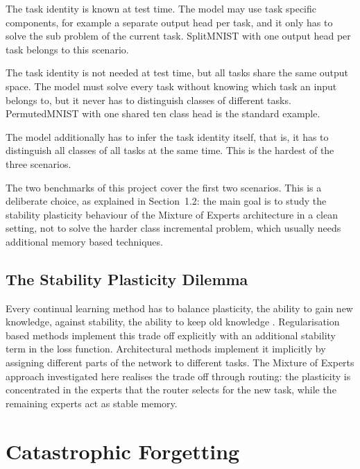 \begin{description}[style=nextline]
  \item[Task incremental learning.] The task identity is known at test
        time. The model may use task specific components, for example a
        separate output head per task, and it only has to solve the sub
        problem of the current task. SplitMNIST with one output head per
        task belongs to this scenario.
  \item[Domain incremental learning.] The task identity is not needed at
        test time, but all tasks share the same output space. The model
        must solve every task without knowing which task an input belongs
        to, but it never has to distinguish classes of different tasks.
        PermutedMNIST with one shared ten class head is the standard
        example.
  \item[Class incremental learning.] The model additionally has to infer
        the task identity itself, that is, it has to distinguish all
        classes of all tasks at the same time. This is the hardest of the
        three scenarios.
\end{description}

The two benchmarks of this project cover the first two scenarios. This is a
deliberate choice, as explained in Section~1.2: the main goal is to study
the stability plasticity behaviour of the Mixture of Experts architecture
in a clean setting, not to solve the harder class incremental problem,
which usually needs additional memory based techniques.

\subsection{The Stability Plasticity Dilemma}
\label{sec:dilemma}

Every continual learning method has to balance plasticity, the ability to
gain new knowledge, against stability, the ability to keep old knowledge
\cite{mermillod2013}. Regularisation based methods implement this trade off
explicitly with an additional stability term in the loss function.
Architectural methods implement it implicitly by assigning different parts
of the network to different tasks. The Mixture of Experts approach
investigated here realises the trade off through routing: the plasticity is
concentrated in the experts that the router selects for the new task, while
the remaining experts act as stable memory.

\section{Catastrophic Forgetting}
\label{sec:forgetting}

